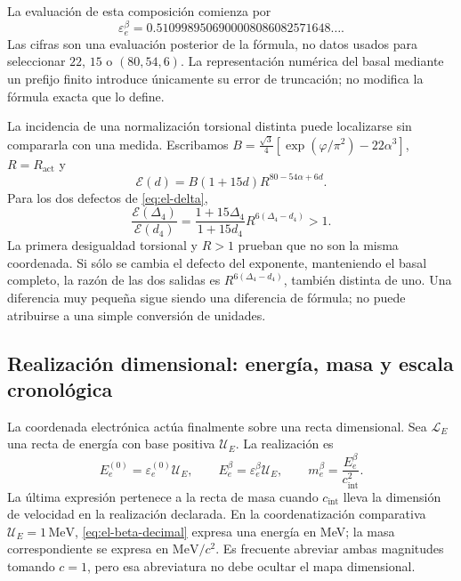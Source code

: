 La evaluación de esta composición comienza por
\begin{equation}
 \varepsilon_e^\beta
 =0.5109989506900008086082571648\ldots.
 \label{eq:el-beta-decimal}
\end{equation}
Las cifras son una evaluación posterior de la fórmula, no datos usados
para seleccionar \(22\), \(15\) o \((80,54,6)\). La representación
numérica del basal mediante un prefijo finito introduce únicamente su
error de truncación; no modifica la fórmula exacta que lo define.

La incidencia de una normalización torsional distinta puede localizarse
sin compararla con una medida. Escribamos
\(B=\frac{\sqrt3}{4}[\exp(\varphi/\pi^2)-22\alpha^3]\),
\(R=R_{\mathrm{act}}\) y
\[
 \mathcal E(d)=B(1+15d)R^{80-54\alpha+6d}.
\]
Para los dos defectos de \eqref{eq:el-delta},
\begin{equation}
 \frac{\mathcal E(\Delta_4)}{\mathcal E(d_4)}
 =\frac{1+15\Delta_4}{1+15d_4}
   R^{6(\Delta_4-d_4)}>1.
 \label{eq:el-normalizacion-beta}
\end{equation}
La primera desigualdad torsional y \(R>1\) prueban que no son la misma
coordenada. Si sólo se cambia el defecto del exponente, manteniendo el
basal completo, la razón de las dos salidas es
\(R^{6(\Delta_4-d_4)}\), también distinta de uno. Una diferencia muy
pequeña sigue siendo una diferencia de fórmula; no puede atribuirse a
una simple conversión de unidades.

\subsection{Realización dimensional: energía, masa y escala cronológica}

La coordenada electrónica actúa finalmente sobre una recta dimensional.
Sea \(\mathcal L_E\) una recta de energía con base positiva
\(\mathcal U_E\). La realización es
\begin{equation}
 E_e^{(0)}=\varepsilon_e^{(0)}\mathcal U_E,\qquad
 E_e^\beta=\varepsilon_e^\beta\mathcal U_E,
 \qquad m_e^\beta=\frac{E_e^\beta}{c_{\mathrm{int}}^2}.
 \label{eq:el-dimensional}
\end{equation}
La última expresión pertenece a la recta de masa cuando
\(c_{\mathrm{int}}\) lleva la dimensión de velocidad en la realización
declarada. En la coordenatización comparativa \(\mathcal U_E=1\,\mathrm{MeV}\),
\eqref{eq:el-beta-decimal} expresa una energía en MeV; la masa
correspondiente se expresa en \(\mathrm{MeV}/c^2\). Es frecuente
abreviar ambas magnitudes tomando \(c=1\), pero esa abreviatura no
debe ocultar el mapa dimensional.

